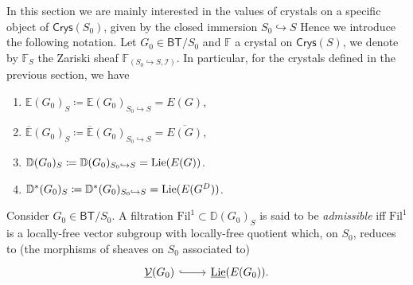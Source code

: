 \begin{ntt}[]\label{CrystalAssociatedZarSheafS}
	In this section we are mainly interested in the values of
	crystals on a specific object of $\mathsf{Crys}(S_0)$, given
	by the closed immersion $S_0 \hookrightarrow S$
	Hence we introduce the following notation.
	Let $G_0 \in \mathsf{BT}/S_0$ and $\mathbb{F}$ a crystal on $\mathsf{Crys}(S)$,
	we denote by $\mathbb{F}_S$ the Zariski sheaf
	$\mathbb{F}_{\left(S_0 \hookrightarrow S, \mathcal{I}\right)}$.
	In particular, for the crystals defined in the previous section, we have
\begin{enumerate}
	\item $\mathbb{E}(G_0)_S \coloneqq \mathbb{E}(G_0)_{S_0 \hookrightarrow S} = E(G)$,
	\item $\overline{\mathbb{E}}(G_0)_S \coloneqq \overline{\mathbb{E}}(G_0)_{S_0 \hookrightarrow S} = 
		\overline{E(G)}$,
	\item $\mathbb{D}(G_0)_S \coloneqq \mathbb{D}(G_0)_{S_0 \hookrightarrow S} = 
		\operatorname{Lie}(E(G))$.
	\item $\mathbb{D}^*(G_0)_S \coloneqq \mathbb{D}^*(G_0)_{S_0 \hookrightarrow S} = 
		\operatorname{Lie}(E(G^D))$.
\end{enumerate}
\end{ntt}


\begin{defn}
	Consider $G_0 \in \mathsf{BT}/S_0$.
	A filtration $\mathrm{Fil}^1 \subset \mathbb{D}(G_0)_S$ is said to be
	\emph{admissible} iff $\mathrm{Fil}^1$ is a locally-free vector subgroup
	with locally-free quotient which, on $S_0$, reduces to
	(the morphisms of sheaves on $S_0$ associated to)
	\begin{equation*}
	\begin{tikzcd}[row sep = 0ex
		,/tikz/column 1/.append style={anchor=base east}
		,/tikz/column 2/.append style={anchor=base west}]
		\underline{\mathcal{V}}(G_0) \arrow[r, "", hookrightarrow] &
		\underline{\lie}(E(G_0))
	.\end{tikzcd}
	\end{equation*} 
\end{defn}


